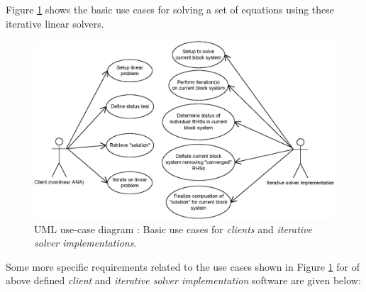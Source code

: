 \documentclass[pdf,ps2pdf,11pt]{SANDreport}
\begin{document}
Figure {}\ref{belos:fig:BelosUseCases} shows the basic use cases for
solving a set of equations using these iterative linear solvers.

{\bsinglespace
\begin{figure}[t]
\begin{center}
\includegraphics*[scale=0.85]{BelosUseCases}
\end{center}
\caption{
\label{belos:fig:BelosUseCases}
UML use-case diagram : Basic use cases
for {}\textit{clients} and {}\textit{iterative solver implementations}.}
\end{figure}
\esinglespace}

Some more specific requirements related to the use cases shown in
Figure {}\ref{belos:fig:BelosUseCases} for of above defined
{}\textit{client} and {}\textit{iterative solver implementation}
software are given below:
\end{document}
